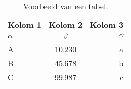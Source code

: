 \begin{table}
  \centering
  \begin{tabular}{lcr}
    \toprule
    \textbf{Kolom 1} & \textbf{Kolom 2} & \textbf{Kolom 3} \\
    $\alpha$         & $\beta$          & $\gamma$         \\
    \midrule
    A                & 10.230           & a                \\
    B                & 45.678           & b                \\
    C                & 99.987           & c                \\
    \bottomrule
  \end{tabular}
  \caption[Voorbeeld tabel]{\label{tab:example}Voorbeeld van een tabel.}
\end{table}

